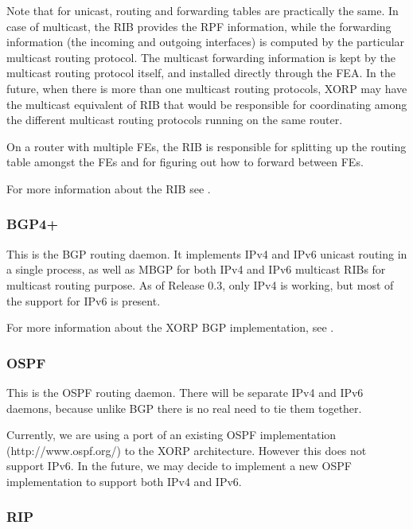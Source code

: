 \documentclass[11pt]{article}
\begin{document}
Note that for unicast, routing and forwarding tables are practically the
same. In case of multicast, the RIB provides the RPF information, while
the forwarding information (the incoming and outgoing interfaces) is
computed by the particular multicast routing protocol. The multicast
forwarding information is kept by the multicast routing protocol itself, and
installed directly through the FEA. In the future, when there is more
than one multicast routing protocols, XORP may have the multicast
equivalent of RIB that would be responsible for coordinating among the
different multicast routing protocols running on the same router.

On a router with multiple FEs, the RIB is responsible for splitting
up the routing table amongst the FEs and for figuring out how to forward
between FEs.

For more information about the RIB see \cite{xorp:rib}.

\subsubsection{BGP4+}

This is the BGP routing daemon. It implements IPv4 and IPv6 unicast
routing in a single process, as well as MBGP for both IPv4 and IPv6
multicast RIBs for multicast routing purpose.  As of Release 0.3, only
IPv4 is working, but most of the support for IPv6 is present.

For more information about the XORP BGP implementation, see \cite{xorp:bgp}.

\subsubsection{OSPF}

This is the OSPF routing daemon. There will be separate IPv4 and IPv6
daemons, because unlike BGP there is no real need to tie them together.

Currently, we are using a port of an existing OSPF implementation
(http://www.ospf.org/) to the XORP architecture.  However this does
not support IPv6.  In the future, we may decide to implement a new
OSPF implementation to support both IPv4 and IPv6.

\subsubsection{RIP}
\end{document}
